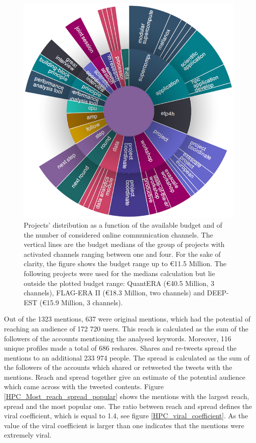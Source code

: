 \begin{figure}[!t] 
 \begin{center}
 \includegraphics[scale=0.55]{Images/HPC_word_burst.png}
 \caption{Projects' distribution as a function of the available budget and of the number of considered online communication channels. The vertical lines are the budget medians of the group of projects with activated channels ranging between one and four. For the sake of clarity, the figure shows the budget range up to \euro 11.5 Million. The following projects were used for the medians calculation but lie outside the plotted budget range: QuantERA (\euro 40.5 Million, 3 channels), FLAG-ERA II (\euro 18.3 Million, two channels) and DEEP-EST (\euro 15.9 Million, 3 channels).}
 \label{HPC_word_burst}
 \end{center}
\end{figure}

Out of the 1323 mentions, 637 were original mentions, which had the potential of reaching an audience of 172 720 users. This reach is calculated as the sum of the followers of the accounts mentioning the analysed keywords. Moreover, 116 unique profiles made a total of 686 reshares. Shares and re-tweets spread the mentions to an additional 233 974 people. The spread is calculated as the sum of the followers of the accounts which shared or retweeted the tweets with the mentions. Reach and spread together give an estimate of the potential audience which came across with the tweeted contents. Figure \ref{HPC_Most_reach_spread_popular} shows the mentions with the largest reach, spread and the most popular one. The ratio between reach and spread defines the viral coefficient, which is equal to 1.4, see figure \ref{HPC_viral_coefficient}. As the value of the viral coefficient is larger than one indicates that the mentions were extremely viral. 

